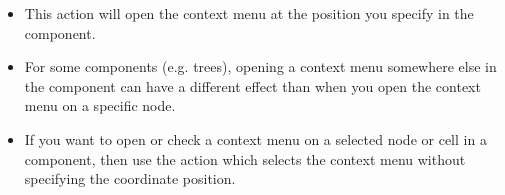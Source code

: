 \begin{itemize}
\item This action will open the context menu at the position you specify in the component.
\item For some components (e.g. trees), opening a context menu somewhere else in the component can have a different effect than when you open the context menu on a specific node.
\item If you want to open or check a context menu on a selected node or cell in a component, then use the action which selects the context menu without specifying the coordinate position.
\end{itemize}
